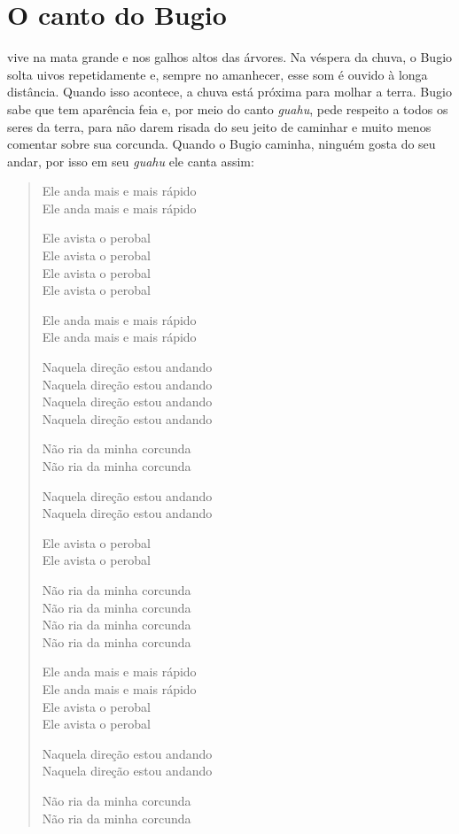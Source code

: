 \chapter{O canto do Bugio}

 vive na mata grande e nos galhos altos das árvores. Na véspera da
chuva, o Bugio solta uivos repetidamente e, sempre no amanhecer, esse
som é ouvido à longa distância. Quando isso acontece, a chuva está
próxima para molhar a terra. Bugio sabe que tem aparência feia e, por
meio do canto \textit{guahu}, pede respeito a todos os seres da terra,
para não darem risada do seu jeito de caminhar e muito menos comentar
sobre sua corcunda. Quando o Bugio caminha, ninguém gosta do seu andar,
por isso em seu \textit{guahu} ele canta assim:

\begin{verse}
Ele anda mais e mais rápido\footnotemark{}\\
Ele anda mais e mais rápido

Ele avista o perobal\footnotemark{}\\
Ele avista o perobal\\
Ele avista o perobal\\
Ele avista o perobal

Ele anda mais e mais rápido\\
Ele anda mais e mais rápido

Naquela direção estou andando\\
Naquela direção estou andando\\
Naquela direção estou andando\\
Naquela direção estou andando

Não ria da minha corcunda\\
Não ria da minha corcunda

Naquela direção estou andando\\
Naquela direção estou andando

Ele avista o perobal\\
Ele avista o perobal

Não ria da minha corcunda\\
Não ria da minha corcunda\\
Não ria da minha corcunda\\
Não ria da minha corcunda	

Ele anda mais e mais rápido\\
Ele anda mais e mais rápido\\
Ele avista o perobal\\
Ele avista o perobal

Naquela direção estou andando\\
Naquela direção estou andando

Não ria da minha corcunda\\
Não ria da minha corcunda
\end{verse}

